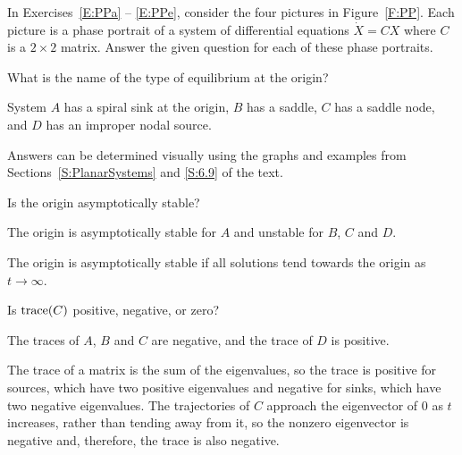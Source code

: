 \documentclass{ximera}
\begin{document}
\begin{exercise}
\begin{solution}
\begin{figure}[htb]
                       \centerline{%
                       }
\end{figure}

\end{solution}
\end{exercise}

\noindent In Exercises~\ref{E:PPa} -- \ref{E:PPe}, consider the four pictures
in Figure~\ref{F:PP}.  Each picture is a phase portrait of a system of
differential equations $\dot{X}=CX$ where $C$ is a $2\times 2$ matrix.  Answer
the given question for each of these phase portraits.
\begin{exercise}  \label{E:PPa}
What is the name of the type of equilibrium at the origin?

\begin{solution}
\ans System $A$ has a spiral sink at the origin, $B$ has a
saddle, $C$ has a saddle node, and $D$ has an improper nodal source.

\soln Answers can be determined visually using the graphs and examples
from Sections~\ref{S:PlanarSystems} and \ref{S:6.9} of the text.

\end{solution}
\end{exercise}
\begin{exercise}  \label{E:PPb}
Is the origin asymptotically stable?

\begin{solution}
\ans The origin is asymptotically stable for $A$ and unstable
for $B$, $C$ and $D$.

\soln The origin is asymptotically stable if all solutions tend towards
the origin as $t \rightarrow \infty$.

\end{solution}
\end{exercise}
\begin{exercise}  \label{E:PPc}
Is ${\rm trace}(C)$ positive, negative, or zero?

\begin{solution}
\ans The traces of $A$, $B$ and $C$ are negative, and the
trace of $D$ is positive.

\soln The trace of a matrix is the sum of the eigenvalues, so the trace
is positive for sources, which have two positive eigenvalues and
negative for sinks, which have two negative eigenvalues.  The trajectories
of $C$ approach the eigenvector of $0$ as $t$ increases, rather
than tending away from it, so the nonzero eigenvector is negative and,
therefore, the trace is also negative.

\end{solution}
\end{exercise}
\end{document}
